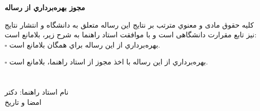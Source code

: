 
\begin{center}
{\Fontf \bfseries مجوز بهره‌برداري از رساله}
\end{center}
\vspace*{1cm}
\noindent
کلیه حقوق مادی و معنوي مترتب بر نتایج این رساله متعلق به دانشگاه و انتشار نتایج نیز تابع مقرارت دانشگاهی است و با موافقت استاد راهنما به شرح زير، بلامانع است:
\\

$\square$
بهره‌برداري از اين رساله براي همگان بلامانع است.

$\square$ 
بهره‌برداري از اين رساله با اخذ مجوز از استاد راهنما، بلامانع است.
\\
\\
\\
{\hspace*{8cm} نام استاد راهنما: دکتر \fasupervisor}
\\
{\hspace*{10.35cm} امضا و تاریخ}
